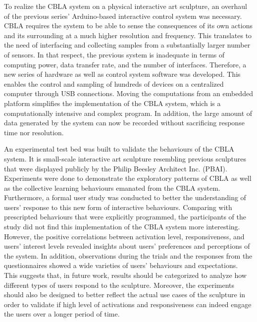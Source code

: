 To realize the CBLA system on a physical interactive art sculpture, an overhaul of the previous series' Arduino-based interactive control system was necessary. CBLA requires the system to be able to sense the consequences of its own actions and its surrounding at a much higher resolution and frequency. This translates to the need of interfacing and collecting samples from a substantially larger number of sensors. In that respect, the previous system is inadequate in terms of computing power, data transfer rate, and the number of interfaces. Therefore, a new series of hardware as well as control system software was developed. This enables the control and sampling of hundreds of devices on a centralized computer through USB connections. Moving the computations from an embedded platform simplifies the implementation of the CBLA system, which is a computationally intensive and complex program. In addition, the large amount of data generated by the system can now be recorded without sacrificing response time nor resolution.  

An experimental test bed was built to validate the behaviours of the CBLA system. It is small-scale interactive art sculpture resembling previous sculptures that were displayed publicly by the Philip Beesley Architect Inc. (PBAI). Experiments were done to demonstrate the exploratory patterns of CBLA as well as the collective learning behaviours emanated from the CBLA system. Furthermore, a formal user study was conducted to better the understanding of users' response to this new form of interactive behaviours. Comparing with prescripted behaviours that were explicitly programmed, the participants of the study did not find this implementation of the CBLA system more interesting. However, the positive correlations between activation level, responsiveness, and users' interest levels revealed insights about users' preferences and perceptions of the system. In addition, observations during the trials and the responses from the questionnaires showed a wide varieties of users' behaviours and expectations. This suggests that, in future work, results should be categorized to analyze how different types of users respond to the sculpture. Moreover, the experiments should also be designed to better reflect the actual use cases of the sculpture in order to validate if high level of activations and responsiveness can indeed engage the users over a longer period of time. 


\cleardoublepage


